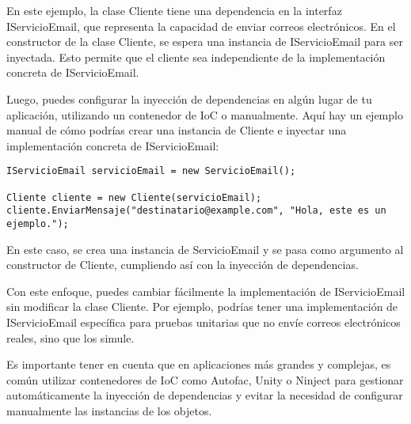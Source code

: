 \documentclass[executivepaper]{article}
\begin{document}
En este ejemplo, la clase Cliente tiene una dependencia en la interfaz IServicioEmail, que representa la capacidad de enviar correos electrónicos. En el constructor de la clase Cliente, se espera una instancia de IServicioEmail para ser inyectada. Esto permite que el cliente sea independiente de la implementación concreta de IServicioEmail.

Luego, puedes configurar la inyección de dependencias en algún lugar de tu aplicación, utilizando un contenedor de IoC o manualmente. Aquí hay un ejemplo manual de cómo podrías crear una instancia de Cliente e inyectar una implementación concreta de IServicioEmail:

\begin{lstlisting}
IServicioEmail servicioEmail = new ServicioEmail();

Cliente cliente = new Cliente(servicioEmail);
cliente.EnviarMensaje("destinatario@example.com", "Hola, este es un ejemplo.");    
\end{lstlisting}

En este caso, se crea una instancia de ServicioEmail y se pasa como argumento al constructor de Cliente, cumpliendo así con la inyección de dependencias.

Con este enfoque, puedes cambiar fácilmente la implementación de IServicioEmail sin modificar la clase Cliente. Por ejemplo, podrías tener una implementación de IServicioEmail específica para pruebas unitarias que no envíe correos electrónicos reales, sino que los simule.

Es importante tener en cuenta que en aplicaciones más grandes y complejas, es común utilizar contenedores de IoC como Autofac, Unity o Ninject para gestionar automáticamente la inyección de dependencias y evitar la necesidad de configurar manualmente las instancias de los objetos.
\end{document}
